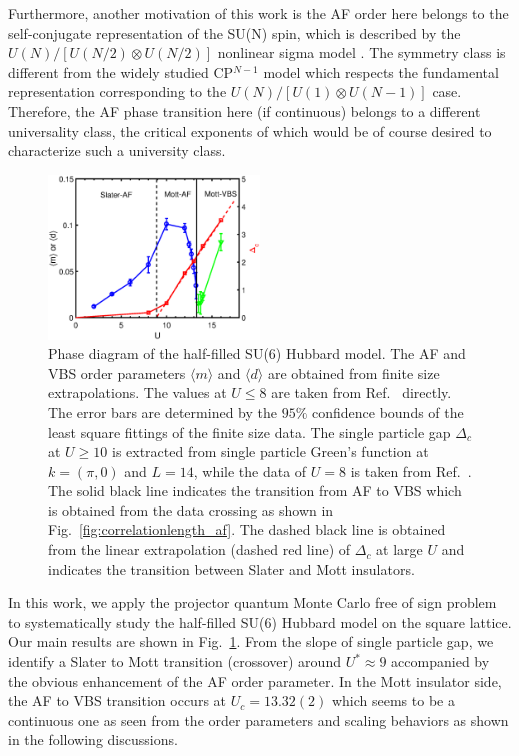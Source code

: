\documentclass[twocolumn,superscriptaddress,prb]{revtex4-1}
\begin{document}
Furthermore, another motivation of this work is the AF order here belongs to the self-conjugate representation of the SU(N) spin, which is described by the $U(N)/[U(N/2)\otimes U(N/2)]$ nonlinear sigma model \cite{MacFarlane_PLB_1979,Duerksen_PRD_1981,Read_PRL_1989,*Read_NPB_1989,*Read_PRB_1990}. The symmetry class is different from the widely studied CP$^{N-1}$ model which respects the fundamental representation corresponding to the $U(N)/[U(1)\otimes U(N-1)]$ case. Therefore, the AF phase transition here (if continuous) belongs to a different universality class, the critical exponents of which would be of course desired to characterize such a university class.

\begin{figure} [h]
    \includegraphics[width=0.5\textwidth]{phasediagram}
    \caption{\label{fig:phasediagram}Phase diagram of the half-filled SU(6) Hubbard model. The AF and VBS order parameters $\langle m \rangle$ and $\langle d \rangle$ are obtained from finite size extrapolations. The values at $U\le8$ are taken from Ref.~ directly. The error bars are determined by the $95\%$ confidence bounds of the least square fittings of the finite size data. The single particle gap $\Delta_c$ at $U\ge10$ is extracted from single particle Green's function at $k=(\pi,0)$ and $L=14$, while the data of $U=8$ is taken from Ref.~. The solid black line indicates the transition from AF to VBS which is obtained from the data crossing as shown in Fig.~\ref{fig:correlationlength_af}. The dashed black line is obtained from the linear extrapolation (dashed red line) of $\Delta_c$ at large $U$ and indicates the transition between Slater and Mott insulators.}
\end{figure}

In this work, we apply the projector quantum Monte Carlo free of sign problem to systematically study the half-filled SU(6) Hubbard model on the square lattice. Our main results are shown in Fig.~\ref{fig:phasediagram}. From the slope of single particle gap, we identify a Slater to Mott transition (crossover) around $U^*\approx9$ accompanied by the obvious enhancement of the AF order parameter. In the Mott insulator side, the AF to VBS transition occurs at $U_c=13.32(2)$ which seems to be a continuous one as seen from the order parameters and scaling behaviors as shown in the following discussions. 
\end{document}
